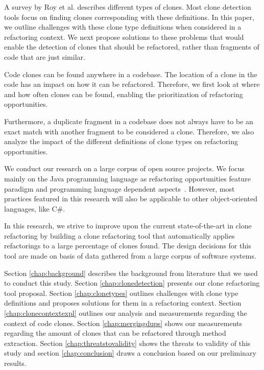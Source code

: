 \documentclass[a4paper]{article}
\begin{document}
A survey by Roy et al. \cite{roy2007survey} describes different types of clones. Most clone detection tools focus on finding clones corresponding with these definitions. In this paper, we outline challenges with these clone type definitions when considered in a refactoring context. We next propose solutions to these problems that would enable the detection of clones that should be refactored, rather than fragments of code that are just similar.

Code clones can be found anywhere in a codebase. The location of a clone in the code has an impact on how it can be refactored. Therefore, we first look at where and how often clones can be found, enabling the prioritization of refactoring opportunities.

Furthermore, a duplicate fragment in a codebase does not always have to be an exact match with another fragment to be considered a clone. Therefore, we also analyze the impact of the different definitions of clone types on refactoring opportunities.

We conduct our research on a large corpus of open source projects. We focus mainly on the Java programming language as refactoring opportunities feature paradigm and programming language dependent aspects~\cite{choi2011extracting}. However, most practices featured in this research will also be applicable to other object-oriented languages, like C\#.

In this research, we strive to improve upon the current state-of-the-art in clone refactoring \cite{fontana2015duplicated, alwaqfi2017refactoring} by building a clone refactoring tool that automatically applies refactorings to a large percentage of clones found. The design decisions for this tool are made on basis of data gathered from a large corpus of software systems.

Section \ref{chap:background} describes the background from literature that we used to conduct this study. Section \ref{chap:clonedetection} presents our clone refactoring tool proposal. Section \ref{chap:clonetypes} outlines challenges with clone type definitions and proposes solutions for them in a refactoring context. Section \ref{chap:clonecontextexpl} outlines our analysis and measurements regarding the context of code clones. Section \ref{chap:mergingdups} shows our measurements regarding the amount of clones that can be refactored through method extraction. Section \ref{chap:threatstovalidity} shows the threats to validity of this study and section \ref{chap:conclusion} draws a conclusion based on our preliminary results.
\end{document}
